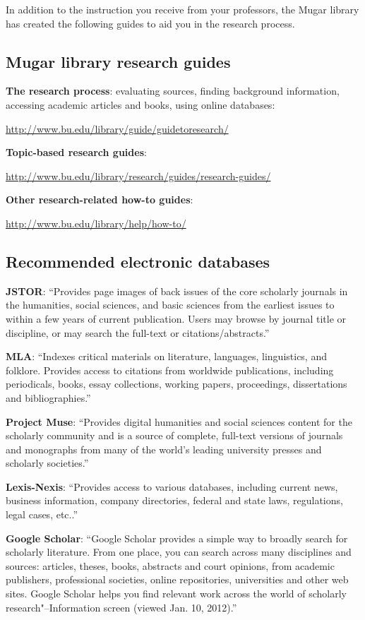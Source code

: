 \documentclass[12pt, hidelinks]{article} %
\begin{document}
In addition to the instruction you receive from your professors, the Mugar library has created the following guides to aid you in the research process.

\subsection{Mugar library research guides}

\textbf{The research process}: evaluating sources, finding background information, accessing academic articles and books, using online databases: 

\url {http://www.bu.edu/library/guide/guidetoresearch/}

\textbf{Topic-based research guides}:

\url{http://www.bu.edu/library/research/guides/research-guides/}

\textbf{Other research-related how-to guides}:

\url{http://www.bu.edu/library/help/how-to/}

\subsection{Recommended electronic databases}


\textbf{JSTOR}: ``Provides page images of back issues of the core scholarly journals in the humanities, social sciences, and basic sciences from the earliest issues to within a few years of current publication. Users may browse by journal title or discipline, or may search the full-text or citations/abstracts.''

\textbf{MLA}: ``Indexes critical materials on literature, languages, linguistics, and folklore. Provides access to citations from worldwide publications, including periodicals, books, essay collections, working papers, proceedings, dissertations and bibliographies.''

\textbf{Project Muse}: ``Provides digital humanities and social sciences content for the scholarly community and is a source of complete, full-text versions of journals and monographs from many of the world's leading university presses and scholarly societies.''

\textbf{Lexis-Nexis}: ``Provides access to various databases, including current news, business information, company directories, federal and state laws, regulations, legal cases, etc..''

\textbf{Google Scholar}: ``Google Scholar provides a simple way to broadly search for scholarly literature. From one place, you can search across many disciplines and sources: articles, theses, books, abstracts and court opinions, from academic publishers, professional societies, online repositories, universities and other web sites. Google Scholar helps you find relevant work across the world of scholarly research"--Information screen (viewed Jan. 10, 2012).''
\end{document}
